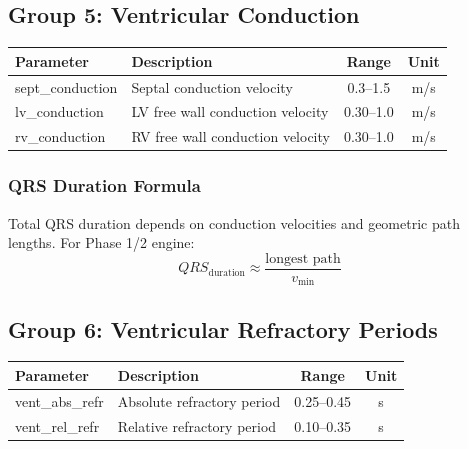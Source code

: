 \documentclass[11pt, a4paper]{article}
\begin{document}
\subsection{Group 5: Ventricular Conduction}

\begin{tabularx}{\textwidth}{|l|X|c|c|}
\hline
\textbf{Parameter} & \textbf{Description} & \textbf{Range} & \textbf{Unit} \\
\hline
sept\_conduction & Septal conduction velocity & 0.3--1.5 & m/s \\
lv\_conduction & LV free wall conduction velocity & 0.30--1.0 & m/s \\
rv\_conduction & RV free wall conduction velocity & 0.30--1.0 & m/s \\
\hline
\end{tabularx}

\subsubsection{QRS Duration Formula}
Total QRS duration depends on conduction velocities and geometric path lengths.
For Phase 1/2 engine:
\begin{equation}
    QRS_{\text{duration}} \approx \frac{\text{longest path}}{v_{\text{min}}}
\end{equation}

\subsection{Group 6: Ventricular Refractory Periods}

\begin{tabularx}{\textwidth}{|l|X|c|c|}
\hline
\textbf{Parameter} & \textbf{Description} & \textbf{Range} & \textbf{Unit} \\
\hline
vent\_abs\_refr & Absolute refractory period & 0.25--0.45 & s \\
vent\_rel\_refr & Relative refractory period & 0.10--0.35 & s \\
\hline
\end{tabularx}
\end{document}
